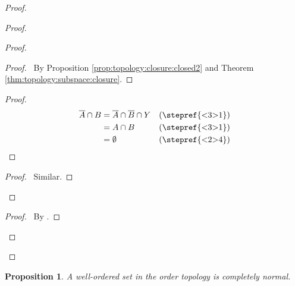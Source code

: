 \documentclass{report}
\let\qed\relax
\newtheorem{prop}[lm]{Proposition}
\theoremstyle{definition}
\begin{document}
\begin{proof}
\begin{proof}
\begin{proof}
\begin{proof}
         \pf\ By Proposition \ref{prop:topology:closure:closed2} and Theorem
         \ref{thm:topology:subspace:closure}.
       \end{proof}
       \begin{proof}
         \begin{align*}
           \overline{A} \cap B & = \overline{A} \cap \overline{B} \cap Y &
           (\text{\stepref{<3>1}}) \\
           & = A \cap B & (\text{\stepref{<3>1}}) \\
           & = \emptyset & (\text{\stepref{<2>4}})
         \end{align*}
       \end{proof}
       \begin{proof}
         \pf\ Similar.
       \end{proof}
     \end{proof}
     \begin{proof}
       \pf\ By .
     \end{proof}
   \end{proof}
   \qed
  \end{proof}

  \begin{prop}
    \label{prop:topology:completely_normal:well_ordered}
   A well-ordered set in the order topology is completely normal.
  \end{prop}
\end{document}
